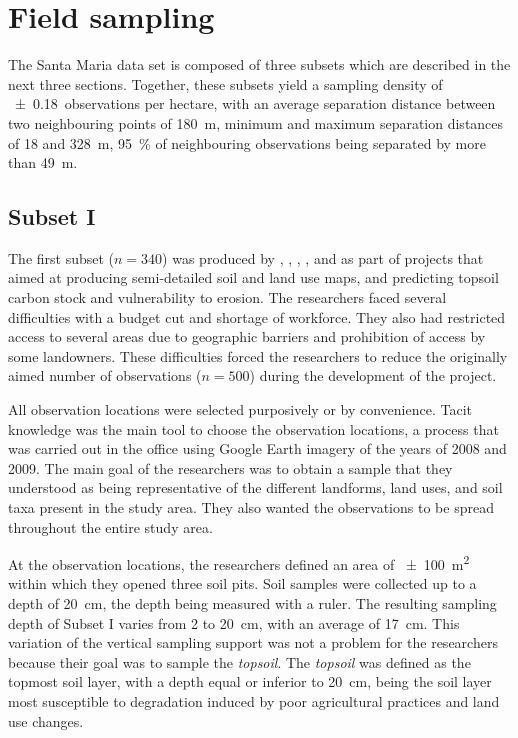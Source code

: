 \tocless\section{Field sampling}

The Santa Maria data set is composed of three subsets which are described in the next three 
sections. Together, these subsets yield a sampling density of \num{\pm0.18}~observations per 
hectare, with an average separation distance between two neighbouring points of \SI{180}{\metre}, 
minimum and maximum separation distances of \num{18} and \SI{328}{\metre}, \SI{95}{\percent} of 
neighbouring observations being separated by more than \SI{49}{\metre}.

\tocless\subsection{Subset I}

The first subset ($n = 340$) was produced by , , 
, , and  as part
of projects that aimed at producing semi-detailed soil and land use maps, and predicting topsoil carbon stock 
and vulnerability to erosion. The researchers faced several difficulties with a budget cut and shortage 
of workforce. They also had restricted access to several areas due to geographic barriers and prohibition of 
access by some landowners. These difficulties forced the researchers to reduce the originally aimed number of 
observations ($n = 500$) during the development of the project.

All observation locations were selected purposively or by convenience. Tacit knowledge was the main tool
to choose the observation locations, a process that was carried out in the office using Google 
Earth\textregistered{} imagery of the years of 2008 and 2009. The main goal of the researchers was 
to obtain a sample that they understood as being representative of the different landforms, land uses, and 
soil taxa present in the study area. They also wanted the observations to be spread throughout the entire 
study area.

At the observation locations, the researchers defined an area of \SI{\pm100}{\metre\squared} within which
they opened three soil pits. Soil samples were collected up to a depth of \SI{20}{\centi\metre}, the depth 
being measured with a ruler. The resulting sampling depth of Subset I varies from \num{2} to 
\SI{20}{\centi\metre}, with an average of \SI{17}{\centi\metre}. This variation of the vertical sampling 
support was not a problem for the researchers because their goal was to sample the \emph{topsoil}. The
\emph{topsoil} was defined as the topmost soil layer, with a depth equal or inferior to 
\SI{20}{\centi\metre}, being the soil layer most susceptible to degradation induced by poor agricultural 
practices and land use changes.

